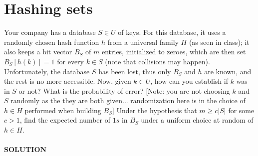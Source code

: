 \documentclass[a4paper]{article}
\begin{document}
\section*{Hashing sets}
Your company has a database $S \in U$ of keys. For this database, it uses a randomly chosen hash function $h$ from a universal family $H$ (as seen in class); it also keeps a bit vector $B_S$ of $m$ entries, initialized to zeroes, which are then set $B_S[h(k)] = 1$ for every $k \in S$ (note that collisions may happen). Unfortunately, the database $S$ has been lost, thus only $B_S$ and $h$ are known, and the rest is no more accessible. Now, given $k \in U$, how can you establish if $k$ was in $S$ or not? What is the probability of error? [Note: you are not choosing $k$ and $S$ randomly as the they are
both given... randomization here is in the choice of $h \in H$ performed when building $B_S$] Under the hypothesis that $m \geq c |S|$ for some $c > 1$, find the expected number of $1s$ in $B_S$ under a uniform choice at random of $h \in H$.
\\ 
\\
\textbf{SOLUTION}
\\
\end{document}
